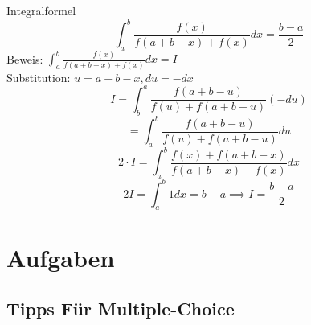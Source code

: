 \documentclass[a4paper,fontsize = 7pt]{scrartcl}
\begin{document}
\begin{mainbox}{Integralformel}
  \vspace{-12pt}
  $$\int_a^b \frac{f(x)}{f(a+b-x)+f(x)}dx = \frac{b-a}{2}$$
  Beweis: 
  $\int_a^b \frac{f(x)}{f(a+b-x)+f(x)}dx = I$
  \\Substitution: $u = a + b -x, du = -dx$
  $$I = \int_b^a \frac{f(a+b-u)}{f(u)+f(a+b-u)}(-du) $$
  $$= \int_a^b \frac{f(a+b-u)}{f(u)+f(a+b-u)}du$$
  $$2 \cdot I = \int_a^b \frac{f(x)+f(a+b-x)}{f(a+b-x)+f(x)}dx$$
  $$2I = \int_a^b1dx = b-a \implies I = \frac{b-a}{2}$$
\end{mainbox}

\section{Aufgaben}
\subsection{Tipps Für Multiple-Choice}%
\end{document}
